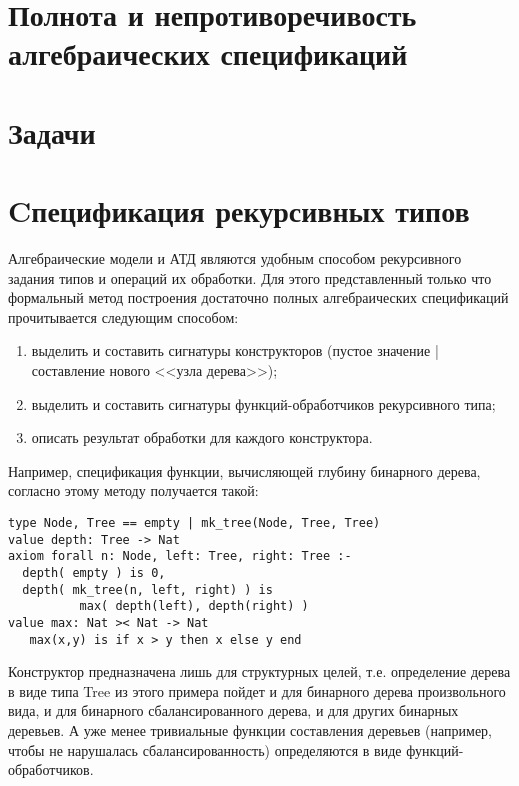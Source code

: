 \documentclass[14pt, twoside]{extreport}
\newcounter{problem_type}[chapter]
\newcommand{\head}[1]{\vspace{1cm}\subsubsection*{#1}}
\begin{document}








\section{Полнота и непротиворечивость алгебраических спецификаций}



\section*{Задачи}





\section{Cпецификация рекурсивных типов}

Алгебраические модели и АТД являются удобным способом рекурсивного задания типов и операций их обработки. Для этого представленный только что формальный метод построения достаточно полных алгебраических спецификаций прочитывается следующим способом:
\begin{enumerate}
  \item выделить и составить сигнатуры конструкторов (пустое значение | составление нового <<узла дерева>>);
  \item выделить и составить сигнатуры функций-обработчиков рекурсивного типа;
  \item описать результат обработки для каждого конструктора.
\end{enumerate}

Например, спецификация функции, вычисляющей глубину бинарного дерева, согласно этому методу получается такой:
\begin{lstlisting}
type Node, Tree == empty | mk_tree(Node, Tree, Tree)
value depth: Tree -> Nat
axiom forall n: Node, left: Tree, right: Tree :-
  depth( empty ) is 0,
  depth( mk_tree(n, left, right) ) is
          max( depth(left), depth(right) )
value max: Nat >< Nat -> Nat
   max(x,y) is if x > y then x else y end
\end{lstlisting}

Конструктор предназначена лишь для структурных целей, т.е. определение дерева в виде типа Tree из этого примера пойдет и для бинарного дерева произвольного вида, и для бинарного сбалансированного дерева, и для других бинарных деревьев. А уже менее тривиальные функции составления деревьев (например, чтобы не нарушалась сбалансированность) определяются в виде функций-обработчиков.
\end{document}

